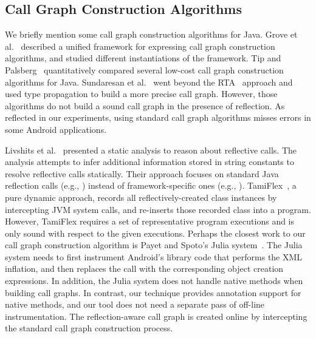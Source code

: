 \tinystep

\subsection{Call Graph Construction Algorithms}

We briefly mention some call graph construction
algorithms for Java. Grove et al.~\cite{kcfa} described a unified
framework for expressing call graph construction algorithms, and
studied different instantiations of the framework.
Tip and Palsberg~\cite{xta} quantitatively compared
several low-cost call graph construction algorithms for Java.
Sundaresan et al.~\cite{Sundaresan:2000} went beyond the
RTA~\cite{rta} approach and used type propagation
to build a more precise call graph.  However,
those algorithms do not build a sound call graph in the presence of reflection.
As reflected in our experiments, using standard call graph algorithms
misses errors in some Android applications.


Livshits et al.~\cite{Livshits:2005} presented a static analysis
to reason about reflective calls. The analysis
attempts to infer additional information stored in string constants to resolve
reflective calls statically. Their approach focuses on standard Java
reflection calls (e.g., ) instead of
framework-specific ones (e.g., ).
TamiFlex~\cite{Bodden:2011}, a pure dynamic
approach, records all reflectively-created class instances
by intercepting JVM system calls, and re-inserts those recorded 
class into a program. However, TamiFlex requires a set of representative
program executions and is only sound with respect to the given executions.
Perhaps the closest work to our call graph
construction algorithm is Payet and Spoto's Julia
system~\cite{Payet:2011:SAA:2032266.2032299}. The Julia system
needs to first instrument Android's library code that performs the XML inflation,
and then replaces the  call with the corresponding
object creation expressions. In addition, the Julia system does not handle
native methods when building call graphs. In contrast, our technique provides
annotation support for native methods, and our tool does not need a separate
pass of off-line instrumentation. The reflection-aware call graph is created
online by intercepting the standard call graph construction process.





